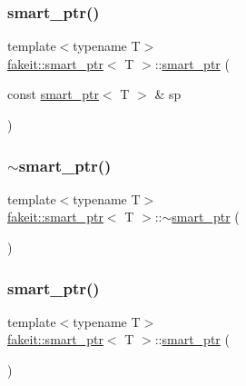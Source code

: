 \subsubsection{\texorpdfstring{smart\_ptr()}{smart\_ptr()}\hspace{0.1cm}{\footnotesize\ttfamily [15/27]}}
{\footnotesize\ttfamily template$<$typename T$>$ \\
\mbox{\hyperlink{classfakeit_1_1smart__ptr}{fakeit\+::smart\+\_\+ptr}}$<$ T $>$\+::\mbox{\hyperlink{classfakeit_1_1smart__ptr}{smart\+\_\+ptr}} (\begin{DoxyParamCaption}\item[{const \mbox{\hyperlink{classfakeit_1_1smart__ptr}{smart\+\_\+ptr}}$<$ T $>$ \&}]{sp }\end{DoxyParamCaption})\hspace{0.3cm}{\ttfamily [inline]}}

\mbox{\label{classfakeit_1_1smart__ptr_a0a184c081564a5a22d8ad0a121614bc5}} 
\subsubsection{\texorpdfstring{$\sim$smart\_ptr()}{~smart\_ptr()}\hspace{0.1cm}{\footnotesize\ttfamily [5/9]}}
{\footnotesize\ttfamily template$<$typename T$>$ \\
\mbox{\hyperlink{classfakeit_1_1smart__ptr}{fakeit\+::smart\+\_\+ptr}}$<$ T $>$\+::$\sim$\mbox{\hyperlink{classfakeit_1_1smart__ptr}{smart\+\_\+ptr}} (\begin{DoxyParamCaption}{ }\end{DoxyParamCaption})\hspace{0.3cm}{\ttfamily [inline]}}

\mbox{\label{classfakeit_1_1smart__ptr_ad718f001e0b0815c80d5cef4f2d4a99a}} 
\subsubsection{\texorpdfstring{smart\_ptr()}{smart\_ptr()}\hspace{0.1cm}{\footnotesize\ttfamily [16/27]}}
{\footnotesize\ttfamily template$<$typename T$>$ \\
\mbox{\hyperlink{classfakeit_1_1smart__ptr}{fakeit\+::smart\+\_\+ptr}}$<$ T $>$\+::\mbox{\hyperlink{classfakeit_1_1smart__ptr}{smart\+\_\+ptr}} (\begin{DoxyParamCaption}{ }\end{DoxyParamCaption})\hspace{0.3cm}{\ttfamily [inline]}}

